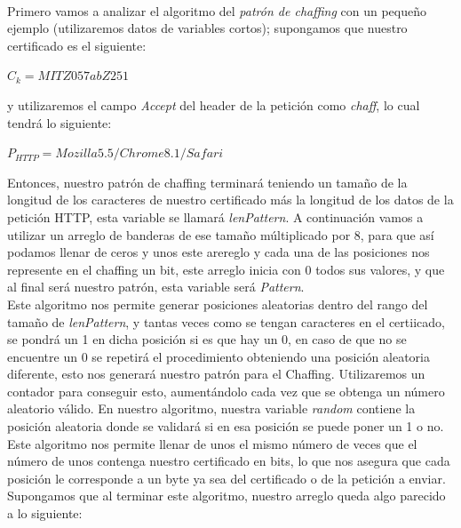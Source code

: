\documentclass[12pt, a4paper, titlepage]{report}
\begin{document}
    		   \paragraph{}
    		   Primero vamos a analizar el algoritmo del \textit{patrón de chaffing} con un pequeño ejemplo (utilizaremos datos de variables cortos); supongamos que nuestro certificado es el siguiente: 
    		    \begin{center}
    		        $C_k = MITZ057abZ251$
    		    \end{center}
    		    y utilizaremos el campo \textit{Accept} del header de la petición como \textit{chaff}, lo cual tendrá lo siguiente:
    		    \begin{center}
    		        $P_{HTTP} = Mozilla5.5/Chrome8.1/Safari$
    		    \end{center}
    		    Entonces, nuestro patrón de chaffing terminará teniendo un tamaño de la longitud de los caracteres de nuestro certificado más la longitud de los datos de la petición HTTP, esta variable se llamará \textit{lenPattern}. A continuación vamos a utilizar un arreglo de banderas de ese tamaño múltiplicado por 8, para que así podamos llenar de ceros y unos este arereglo y cada una de las posiciones nos represente en el chaffing un bit, este arreglo inicia con 0 todos sus valores, y que al final será nuestro patrón, esta variable será \textit{Pattern}.\\
    		    
    		    Este algoritmo nos permite generar posiciones aleatorias dentro del rango del tamaño de \textit{lenPattern}, y tantas veces como se tengan caracteres en el certiicado, se pondrá un 1 en dicha posición si es que hay un 0, en caso de que no se encuentre un 0 se repetirá el procedimiento obteniendo una posición aleatoria diferente, esto nos generará nuestro patrón para el Chaffing. Utilizaremos un contador para conseguir esto, aumentándolo cada vez que se obtenga un número aleatorio válido. En nuestro algoritmo, nuestra variable \textit{random} contiene la posición aleatoria donde se validará si en esa posición se puede poner un 1 o no.\\
    		    
        		
        		Este algoritmo nos permite llenar de unos el mismo número de veces que el número de unos contenga nuestro certificado en bits, lo que nos asegura que cada posición le corresponde a un byte ya sea del certificado o de la petición a enviar. Supongamos que al terminar este algoritmo, nuestro arreglo queda algo parecido a lo siguiente:
        		
\end{document}
